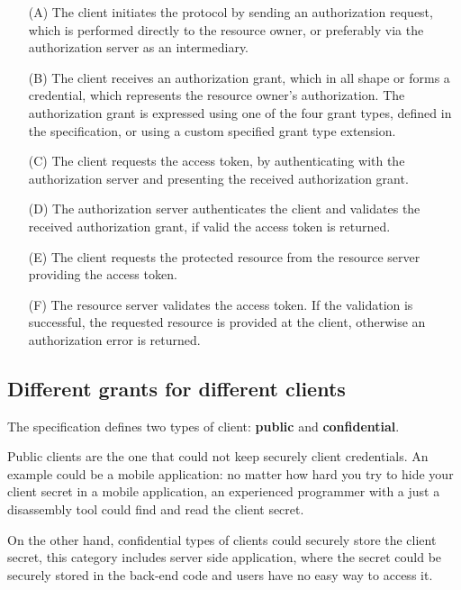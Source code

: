 \begin{itemize}
     \item[(A)]
         The client initiates the protocol by sending an authorization request,
         which is performed directly to the resource owner, or preferably via
         the authorization server as an intermediary.
     \item[(B)]
         The client receives an authorization grant, which in all shape or
         forms a credential, which represents the resource owner's
         authorization.  The authorization grant is expressed using one of the
         four grant types, defined in the specification, or using a custom
         specified grant type extension.
     \item[(C)]
         The client requests the access token, by authenticating with the
         authorization server and presenting the received authorization grant.
     \item[(D)]
         The authorization server authenticates the client and validates the
         received authorization grant, if valid the access token is returned.
     \item[(E)]
         The client requests the protected resource from the resource
         server providing the access token.
     \item[(F)]
         The resource server validates the access token.
         If the validation is successful, the requested resource is provided at the client,
         otherwise an authorization error is returned.
 \end{itemize}

\subsection{Different grants for different clients}
\label{sec:grant-types-overview}
The specification defines two types of client: \textbf{public} and \textbf{confidential}.

Public clients are the one that could not keep securely client credentials.
An example could be a mobile application: no matter how hard you try to hide
your client secret in a mobile application, an experienced programmer with a
just a disassembly tool could find and read the client secret.

On the other hand, confidential types of clients could securely store the
client secret, this category includes server side application, where the secret
could be securely stored in the back-end code and users have no easy way to
access it.

